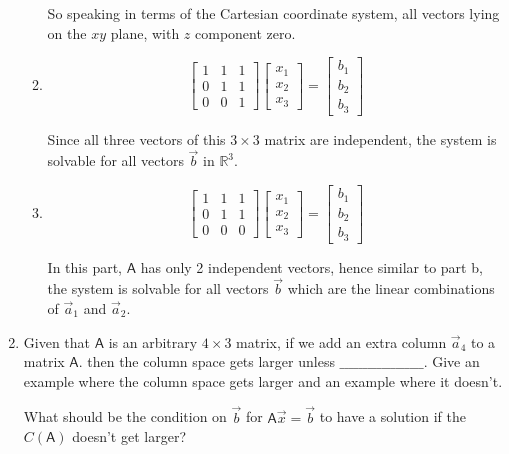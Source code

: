 \documentclass[a4paper, 11pt]{article}
\newcommand{\mat}[1]{\boldsymbol { \mathsf{#1}} }
\begin{document}
\begin{enumerate}
\begin{enumerate}
So speaking in terms of the Cartesian coordinate system, all vectors lying on the $xy$ plane, with $z$ component zero.

\item 
\[ 
\left[ \begin{array}{ccc}
1  & 1 & 1\\
0  & 1 & 1\\
0 & 0 & 1
\end{array} \right]
%
\left[ \begin{array}{c}
 x_1\\
 x_2\\
x_3
\end{array} \right]
%
= \left[ \begin{array}{c}
 b_1\\
 b_2\\
 b_3 
\end{array} \right]
\]

Since all three vectors of this $3\times3$ matrix are independent, the system is solvable for all vectors $\vec b$ in $\mathds{R}^3$.
\item
\[
 \left[ \begin{array}{ccc}
1  & 1 & 1\\
0  & 1 & 1\\
0 & 0 & 0
\end{array} \right]
%
\left[ \begin{array}{c}
 x_1\\
 x_2\\
x_3
\end{array} \right]
%
= \left[ \begin{array}{c}
 b_1\\
 b_2\\
 b_3 
\end{array} \right]
\]

In this part, $\mat A$ has only 2 independent vectors, hence similar to part b, the system is solvable for all vectors $\vec b$ which are the linear combinations of $\vec a_1$ and $\vec a_2$.

\end{enumerate}

\item Given that $\mat A$ is an arbitrary $4 \times 3$ matrix, if we add an extra column $\vec a_4$ to a matrix $\mat A$. then the column space gets larger unless $\_ \_ \_\_ \_ \_\_ \_ \_\_ \_ \_\_ \_ \_\_ \_ \_$. Give an example where the column space gets larger and an example where it doesn't. 

What should be the condition on $\vec b$ for $\mat A \vec x = \vec b$ to have a solution if the $C(\mat A)$ doesn't get larger?  


\end{enumerate}
\end{document}
